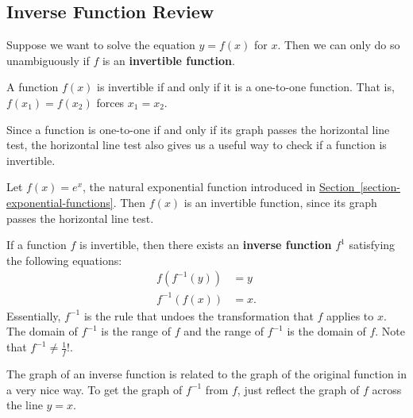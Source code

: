\documentclass[10pt,]{book}
\newcommand{\terminology}[1]{\textbf{#1}}
\theoremstyle{ptxplainnotitle}
\theoremstyle{ptxplaintitle}
\theoremstyle{ptxplainnotitle}
\theoremstyle{ptxplaintitle}
\theoremstyle{ptxplainnotitle}
\theoremstyle{ptxplaintitle}
\theoremstyle{ptxdefinitionnotitle}
\theoremstyle{ptxdefinitiontitle}
\theoremstyle{ptxdefinitionnotitle}
\theoremstyle{ptxdefinitiontitle}
\theoremstyle{ptxdefinitionnotitle}
\theoremstyle{ptxdefinitiontitle}
\theoremstyle{ptxdefinitionnotitle}
\theoremstyle{ptxdefinitiontitle}
\theoremstyle{ptxdefinitionnotitle}
\theoremstyle{ptxdefinitiontitle}
\numberwithin{equation}{section}
\begin{document}
\subsection[{Inverse Function Review}]{Inverse Function Review}\label{subsection-inverse-function-review}
\hypertarget{p-198}{}%
Suppose we want to solve the equation \(y = f(x)\) for \(x\). Then we can only do so unambiguously if \(f\) is an \terminology{invertible function}.%
\begin{definition}\label{definition-invertible-functions}
\hypertarget{p-199}{}%
A function \(f(x)\) is invertible if and only if it is a one-to-one function. That is, \(f(x_{1}) = f(x_{2})\) forces \(x_{1} = x_{2}\).%
\end{definition}
\hypertarget{p-200}{}%
Since a function is one-to-one if and only if its graph passes the horizontal line test, the horizontal line test also gives us a useful way to check if a function is invertible.%
\begin{example}\label{example-exponential-inverse}
\hypertarget{p-201}{}%
Let \(f(x) = e^{x}\), the natural exponential function introduced in \hyperref[section-exponential-functions]{Section~\ref{section-exponential-functions}}. Then \(f(x)\) is an invertible function, since its graph passes the horizontal line test.%
\end{example}
\hypertarget{p-202}{}%
If a function \(f\) is invertible, then there exists an \terminology{inverse function} \(f^{1}\) satisfying the following equations:%
\begin{align*}
f(f^{-1}(y)) & = y \\
f^{-1}(f(x)) & = x. 
\end{align*}
Essentially, \(f^{-1}\) is the rule that undoes the transformation that \(f\) applies to \(x\). The domain of \(f^{-1}\) is the range of \(f\) and the range of \(f^{-1}\) is the domain of \(f\). Note that \(f^{-1}\neq\frac{1}{f}\)!.%
\par
\hypertarget{p-203}{}%
The graph of an inverse function is related to the graph of the original function in a very nice way. To get the graph of \(f^{-1}\) from \(f\), just reflect the graph of \(f\) across the line \(y=x\).%
\end{document}
